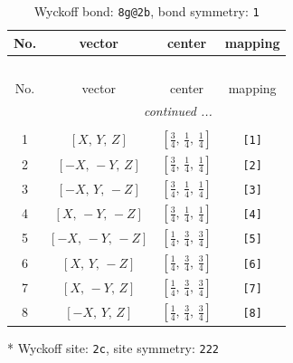 \documentclass[fleqn,8pt]{jsarticle}
\begin{document}
\renewcommand{\arraystretch}{1.2}
\begin{longtable}{cccc}
\caption{Wyckoff bond: {\tt 8g@2b}, bond symmetry: {\tt 1}}
 \\
 \hline \hline
No. & vector & center & mapping \\ \hline \endfirsthead

\multicolumn{3}{l}{\tablename\ \thetable{}} \\
 \hline \hline
No. & vector & center & mapping \\ \hline \endhead

 \hline \hline
\multicolumn{3}{r}{\footnotesize\it continued ...} \\ \endfoot

 \hline \hline
\multicolumn{3}{r}{} \\ \endlastfoot

1 & $\left[ X,\, Y,\, Z \right]$ & $\left[ \frac{3}{4},\, \frac{1}{4},\, \frac{1}{4} \right]$ & {\tt [1]} \\ \hline
2 & $\left[ - X,\, - Y,\, Z \right]$ & $\left[ \frac{3}{4},\, \frac{1}{4},\, \frac{1}{4} \right]$ & {\tt [2]} \\ \hline
3 & $\left[ - X,\, Y,\, - Z \right]$ & $\left[ \frac{3}{4},\, \frac{1}{4},\, \frac{1}{4} \right]$ & {\tt [3]} \\ \hline
4 & $\left[ X,\, - Y,\, - Z \right]$ & $\left[ \frac{3}{4},\, \frac{1}{4},\, \frac{1}{4} \right]$ & {\tt [4]} \\ \hline
5 & $\left[ - X,\, - Y,\, - Z \right]$ & $\left[ \frac{1}{4},\, \frac{3}{4},\, \frac{3}{4} \right]$ & {\tt [5]} \\ \hline
6 & $\left[ X,\, Y,\, - Z \right]$ & $\left[ \frac{1}{4},\, \frac{3}{4},\, \frac{3}{4} \right]$ & {\tt [6]} \\ \hline
7 & $\left[ X,\, - Y,\, Z \right]$ & $\left[ \frac{1}{4},\, \frac{3}{4},\, \frac{3}{4} \right]$ & {\tt [7]} \\ \hline
8 & $\left[ - X,\, Y,\, Z \right]$ & $\left[ \frac{1}{4},\, \frac{3}{4},\, \frac{3}{4} \right]$ & {\tt [8]} \\
\end{longtable}
* Wyckoff site: {\tt 2c}, site symmetry: {\tt 222}
\renewcommand{\arraystretch}{1.2}
\end{document}
